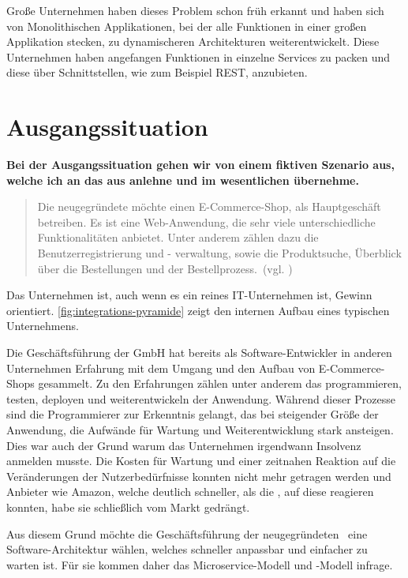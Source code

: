 Große Unternehmen haben dieses Problem schon früh erkannt und haben sich von Monolithischen Applikationen, bei der alle Funktionen in einer großen Applikation stecken, zu dynamischeren Architekturen weiterentwickelt. Diese Unternehmen haben angefangen Funktionen in einzelne Services zu packen und diese über Schnittstellen, wie zum Beispiel REST, anzubieten.

\section{Ausgangssituation}
\label{sec:ausgangssituation}
\textbf{Bei der Ausgangssituation gehen wir von einem fiktiven Szenario aus, welche ich an das aus \cite[S. 15]{EWolff2016:Microservices} anlehne und im wesentlichen übernehme.}

\begin{quotation}
    \frqq Die neugegründete \textit{\gmbh} möchte einen E-Commerce-Shop, als Hauptgeschäft betreiben. Es ist eine Web-Anwendung, die sehr viele unterschiedliche Funktionalitäten anbietet. Unter anderem zählen dazu die Benutzerregistrierung und - verwaltung, sowie die Produktsuche, Überblick über die Bestellungen und der Bestellprozess.\flqq\ (vgl. \cite[S. 15]{EWolff2016:Microservices})
\end{quotation}

Das Unternehmen ist, auch wenn es ein reines IT-Unternehmen ist, Gewinn orientiert. \ref{fig:integrations-pyramide} zeigt den internen Aufbau eines typischen Unternehmens.

Die Geschäftsführung der GmbH hat bereits als Software-Entwickler in anderen Unternehmen Erfahrung mit dem Umgang und den Aufbau von E-Commerce-Shops gesammelt. Zu den Erfahrungen zählen unter anderem das programmieren, testen, deployen und weiterentwickeln der Anwendung. Während dieser Prozesse sind die Programmierer zur Erkenntnis gelangt, das bei steigender Größe der Anwendung, die Aufwände für Wartung und Weiterentwicklung stark ansteigen. Dies war auch der Grund warum das Unternehmen irgendwann Insolvenz anmelden musste. Die Kosten für Wartung und einer zeitnahen Reaktion auf die Veränderungen der Nutzerbedürfnisse konnten nicht mehr getragen werden und Anbieter wie Amazon, welche deutlich schneller, als die \gmbh ,  auf diese reagieren konnten, habe sie schließlich vom Markt gedrängt.

Aus diesem Grund möchte die Geschäftsführung der neugegründeten \gmbh\ eine Software-Architektur wählen, welches schneller anpassbar und einfacher zu warten ist. Für sie kommen daher das Microservice-Modell und \SOA -Modell infrage.

